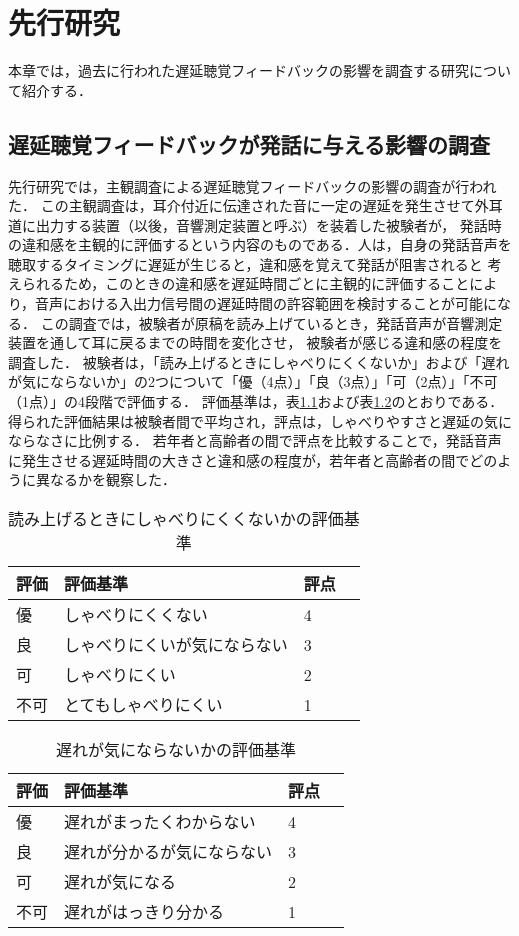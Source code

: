 \chapter{先行研究}
本章では，過去に行われた遅延聴覚フィードバックの影響を調査する研究について紹介する．
\section{遅延聴覚フィードバックが発話に与える影響の調査}
先行研究\cite{kayama}では，主観調査による遅延聴覚フィードバックの影響の調査が行われた．
この主観調査は，耳介付近に伝達された音に一定の遅延を発生させて外耳道に出力する装置（以後，音響測定装置と呼ぶ）を装着した被験者が，
発話時の違和感を主観的に評価するという内容のものである．人は，自身の発話音声を聴取するタイミングに遅延が生じると，違和感を覚えて発話が阻害されると
考えられるため，このときの違和感を遅延時間ごとに主観的に評価することにより，音声における入出力信号間の遅延時間の許容範囲を検討することが可能になる．
この調査では，被験者が原稿を読み上げているとき，発話音声が音響測定装置を通して耳に戻るまでの時間を変化させ，
被験者が感じる違和感の程度を調査した．
被験者は，「読み上げるときにしゃべりにくくないか」および「遅れが気にならないか」の2つについて「優（4点）」「良（3点）」「可（2点）」「不可（1点）」の4段階で評価する．
評価基準は，表\ref{table:evaluation-1}および表\ref{table:evaluation-2}のとおりである．
得られた評価結果は被験者間で平均され，評点は，しゃべりやすさと遅延の気にならなさに比例する．
若年者と高齢者の間で評点を比較することで，発話音声に発生させる遅延時間の大きさと違和感の程度が，若年者と高齢者の間でどのように異なるかを観察した．
\begin{table}[tbp]
  \caption{読み上げるときにしゃべりにくくないかの評価基準}
  \label{table:evaluation-1}
  \centering
  \begin{tabular}{lllc}
    \hline
    評価 & 評価基準 & 評点\\
    \hline \hline
    優  & しゃべりにくくない & 4\\
    良  & しゃべりにくいが気にならない & 3\\
    可  & しゃべりにくい & 2\\
    不可  & とてもしゃべりにくい & 1\\
    \hline
  \end{tabular}
\end{table}
\begin{table}[tbp]
  \caption{遅れが気にならないかの評価基準}
  \label{table:evaluation-2}
  \centering
  \begin{tabular}{lllc}
    \hline
    評価 & 評価基準 & 評点\\
    \hline \hline
    優  & 遅れがまったくわからない & 4\\
    良  & 遅れが分かるが気にならない & 3\\
    可  & 遅れが気になる & 2\\
    不可  & 遅れがはっきり分かる & 1\\
    \hline
  \end{tabular}
\end{table}
